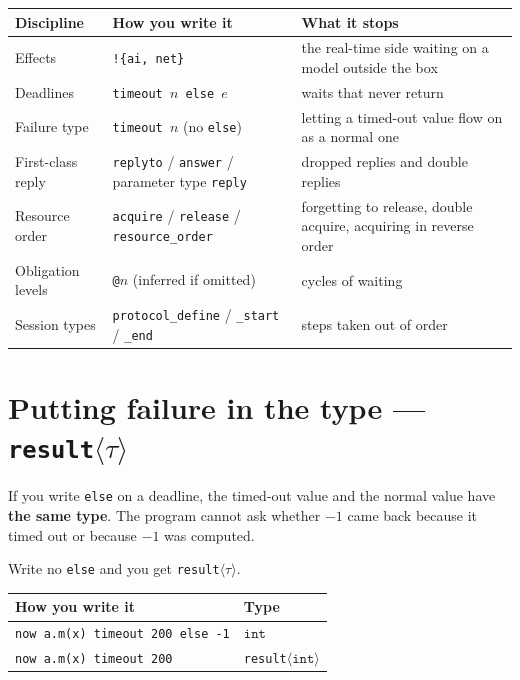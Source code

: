 \documentclass[11pt,a4paper]{article}
\newcommand{\ty}[1]{\ensuremath{\mathtt{#1}}}
\begin{document}
\begin{center}
\small
\begin{tabular}{@{}lp{5.6cm}p{4.0cm}@{}}
\toprule
Discipline & How you write it & What it stops \\
\midrule
Effects & \texttt{!\{ai, net\}} & the real-time side waiting on a model outside the box \\
Deadlines & \texttt{timeout $n$ else $e$} & waits that never return \\
Failure type & \texttt{timeout $n$} (no \texttt{else}) & letting a timed-out value flow on as a normal one \\
First-class reply & \texttt{replyto} / \texttt{answer} / parameter type \texttt{reply} & dropped replies and double replies \\
Resource order & \texttt{acquire} / \texttt{release} / \texttt{resource\_order} & forgetting to release, double acquire, acquiring in reverse order \\
Obligation levels & \texttt{@$n$} (inferred if omitted) & cycles of waiting \\
Session types & \texttt{protocol\_define} / \texttt{\_start} / \texttt{\_end} & steps taken out of order \\
\bottomrule
\end{tabular}
\end{center}

\section{Putting failure in the type --- \texttt{result}$\langle\tau\rangle$}
\label{sec:result}

If you write \texttt{else} on a deadline, the timed-out value and the normal
value have \textbf{the same type}. The program cannot ask whether $-1$ came
back because it timed out or because $-1$ was computed.

Write no \texttt{else} and you get \texttt{result}$\langle\tau\rangle$.

\begin{center}
\begin{tabular}{@{}ll@{}}
\toprule
How you write it & Type \\
\midrule
\texttt{now a.m(x) timeout 200 else -1} & \ty{int} \\
\texttt{now a.m(x) timeout 200} & \texttt{result}$\langle$\ty{int}$\rangle$ \\
\bottomrule
\end{tabular}
\end{center}
\end{document}
